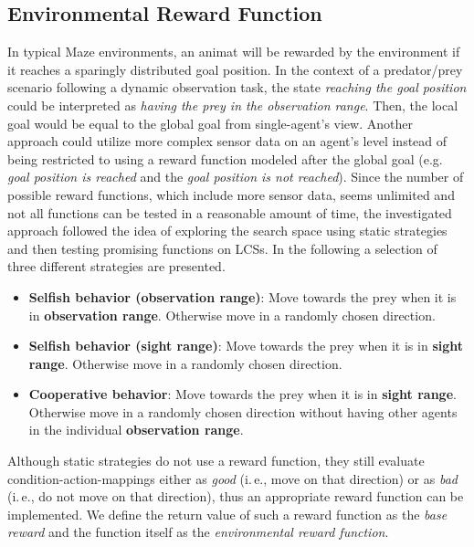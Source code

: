 \subsection{Environmental Reward Function}
\label{subsection:environment-reward-function}

In typical Maze environments, an animat will be rewarded by the environment if it reaches a sparingly distributed goal position. In the context of a predator/prey scenario following a dynamic observation task, the state \emph{reaching the goal position} could be interpreted as \emph{having the prey in the observation range}. Then, the local goal would be equal to the global goal from single-agent's view. Another approach could utilize more complex sensor data on an agent's level instead of being restricted to using a reward function modeled after the global goal (e.g. \emph{goal position is reached} and the \emph{goal position is not reached}). Since the number of possible reward functions, which include more sensor data, seems unlimited and not all functions can be tested in a reasonable amount of time, the investigated approach followed the idea of exploring the search space using static strategies and then testing promising functions on LCSs. In the following a selection of three different strategies are presented. 


\begin{itemize}
	\item {\bf Selfish behavior (observation range)}: Move towards the prey when it is in {\bf observation range}. Otherwise move in a randomly chosen direction.
	\item {\bf Selfish behavior (sight range)}: Move towards the prey when it is in {\bf sight range}. Otherwise move in a randomly chosen direction.
	\item {\bf Cooperative behavior}: Move towards the prey when it is in {\bf sight range}. Otherwise move in a randomly chosen direction without having other agents in the individual {\bf observation range}.
\end{itemize}

Although static strategies do not use a reward function, they still evaluate condition-action-mappings either as \emph{good} (i.\,e., move on that direction) or as \emph{bad} (i.\,e., do not move on that direction), thus an appropriate reward function can be implemented. We define the return value of such a reward function as the \emph{base reward} and the function itself as the \emph{environmental reward function}.

